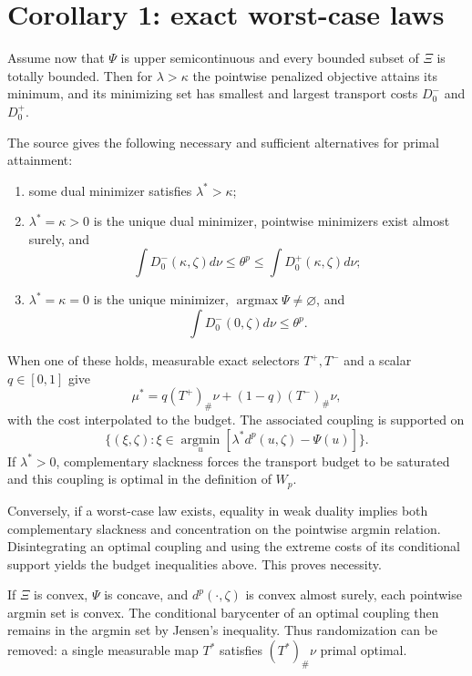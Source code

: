\section{Corollary 1: exact worst-case laws}
Assume now that \(\Psi\) is upper semicontinuous and every bounded subset of \(\Xi\) is totally
bounded.  Then for \(\lambda>\kappa\) the pointwise penalized objective attains its minimum, and
its minimizing set has smallest and largest transport costs \(D_0^-\) and \(D_0^+\).

The source gives the following necessary and sufficient alternatives for primal attainment:
\begin{enumerate}[leftmargin=2em,label=(\alph*)]
\item some dual minimizer satisfies \(\lambda^*>\kappa\);
\item \(\lambda^*=\kappa>0\) is the unique dual minimizer, pointwise minimizers exist almost
      surely, and
\[
 \int D_0^-(\kappa,\zeta)d\nu
 \le\theta^p\le
 \int D_0^+(\kappa,\zeta)d\nu;
\]
\item \(\lambda^*=\kappa=0\) is the unique minimizer,
      \(\operatorname*{argmax}\Psi\ne\varnothing\), and
\[
 \int D_0^-(0,\zeta)d\nu\le\theta^p.
\]
\end{enumerate}
When one of these holds, measurable exact selectors \(T^+,T^-\) and a scalar
\(q\in[0,1]\) give
\begin{equation}\label{eq:gk-worst-law}
 \mu^*=q(T^+)_\#\nu+(1-q)(T^-)_\#\nu,
\end{equation}
with the cost interpolated to the budget.  The associated coupling is supported on
\[
 \{(\xi,\zeta):
   \xi\in\operatorname*{argmin}_{u}
      [\lambda^*d^p(u,\zeta)-\Psi(u)]\}.
\]
If \(\lambda^*>0\), complementary slackness forces the transport budget to be saturated and this
coupling is optimal in the definition of \(W_p\).

Conversely, if a worst-case law exists, equality in weak duality implies both complementary
slackness and concentration on the pointwise argmin relation.  Disintegrating an optimal coupling
and using the extreme costs of its conditional support yields the budget inequalities above.  This
proves necessity.

If \(\Xi\) is convex, \(\Psi\) is concave, and \(d^p(\cdot,\zeta)\) is convex almost surely, each
pointwise argmin set is convex.  The conditional barycenter of an optimal coupling then remains in
the argmin set by Jensen's inequality.  Thus randomization can be removed: a single measurable
map \(T^*\) satisfies \((T^*)_\#\nu\) primal optimal.

